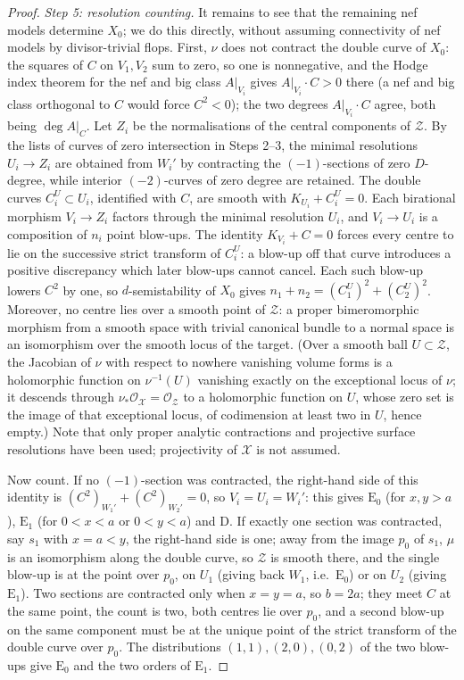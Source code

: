 \documentclass[11pt]{article}
\newcommand{\calX}{\mathcal X}
\newcommand{\calZ}{\mathcal Z}
\theoremstyle{definition}
\theoremstyle{remark}
\begin{document}
\begin{proof}
\emph{Step 5: resolution counting.}
It remains to see that the remaining nef models determine \(X_0\); we
do this directly, without assuming connectivity of nef models by
divisor-trivial flops. First, \(\nu\) does not contract the double curve
of \(X_0\): the squares of \(C\) on \(V_1,V_2\) sum to zero, so one is
nonnegative, and the Hodge index theorem for the nef and big class
\(A|_{V_i}\) gives \(A|_{V_i}\cdot C>0\) there (a nef and big class
orthogonal to \(C\) would force \(C^2<0\)); the two degrees
\(A|_{V_i}\cdot C\) agree, both being \(\deg A|_C\). Let \(Z_i\) be the normalisations of the
central components of \(\calZ\). By the lists of curves of zero
intersection in Steps 2--3, the minimal resolutions \(U_i\to Z_i\) are
obtained from \(W_i'\) by contracting the \((-1)\)-sections of zero
\(D\)-degree, while interior \((-2)\)-curves of zero degree are
retained. The double curves \(C_i^U\subset U_i\), identified with
\(C\), are smooth with \(K_{U_i}+C_i^U=0\). Each birational morphism
\(V_i\to Z_i\) factors through the minimal resolution \(U_i\), and
\(V_i\to U_i\) is a composition of \(n_i\) point blow-ups. The
identity \(K_{V_i}+C=0\) forces every centre to lie on the successive
strict transform of \(C_i^U\): a blow-up off that curve introduces a
positive discrepancy which later blow-ups cannot cancel. Each such
blow-up lowers \(C^2\) by one, so \(d\)-semistability of \(X_0\) gives
\(n_1+n_2=(C_1^U)^2+(C_2^U)^2\). Moreover, no centre lies over a smooth point of \(\calZ\): a proper
bimeromorphic morphism from a smooth space with trivial canonical
bundle to a normal space is an isomorphism over the smooth locus of
the target. (Over a smooth ball \(U\subset\calZ\), the Jacobian of
\(\nu\) with respect to nowhere vanishing volume forms is a holomorphic
function on \(\nu^{-1}(U)\) vanishing exactly on the exceptional locus
of \(\nu\); it descends through
\(\nu_*\mathcal O_{\calX}=\mathcal O_{\calZ}\) to a holomorphic function
on \(U\), whose zero set is the image of that exceptional locus, of
codimension at least two in \(U\), hence empty.) Note that only proper analytic
contractions and projective surface resolutions have been used;
projectivity of \(\calX\) is not assumed.

Now count. If no \((-1)\)-section was contracted, the right-hand side
of this identity is \((C^2)_{W_1'}+(C^2)_{W_2'}=0\), so \(V_i=U_i=W_i'\): this gives
\(\mathrm E_0\) (for \(x,y>a\)), \(\mathrm E_1\) (for \(0<x<a\) or
\(0<y<a\)) and \(\mathrm D\). If exactly one section was contracted,
say \(s_1\) with \(x=a<y\), the right-hand side is one; away from the
image \(p_0\) of \(s_1\), \(\mu\) is an isomorphism along the double
curve, so \(\calZ\) is smooth there, and the single blow-up is at the
point over \(p_0\), on \(U_1\) (giving back \(W_1\), i.e.\
\(\mathrm E_0\)) or on \(U_2\) (giving \(\mathrm E_1\)). Two sections
are contracted only when \(x=y=a\), so \(b=2a\); they meet \(C\) at
the same point, the count is two, both centres lie over \(p_0\), and a
second blow-up on the same component must be at the unique point of
the strict transform of the double curve over \(p_0\). The
distributions \((1,1),(2,0),(0,2)\) of the two blow-ups give
\(\mathrm E_0\) and the two orders of \(\mathrm E_1\).


\end{proof}
\end{document}
